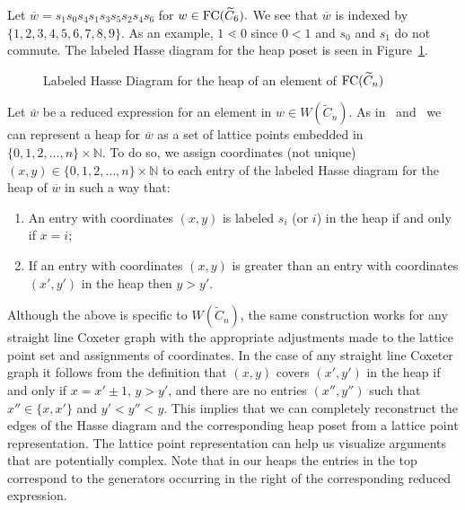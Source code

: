 \begin{example}
Let $\overline{w}=s_1s_0s_4s_1s_3s_5s_2s_4s_6$ for $w \in \mathrm{FC}(\widetilde{C}_6).$ We see that $\overline{w}$ is indexed by $\{1,2,3,4,5,6,7,8,9\}$. As an example, $1 \lessdot 0$ since $0 <1$ and $s_0$ and $s_1$ do not commute. The labeled Hasse diagram for the heap poset is seen in Figure~\ref{fig:Hasse}.
\begin{figure}[h]
\centering
{}
\caption{Labeled Hasse Diagram for the heap of an element of $\mathrm{FC}(\widetilde{C}_n)$}
\label{fig:Hasse}	
\end{figure}
\end{example}

Let $\overline{w}$ be a reduced expression for an element in $w \in W(\widetilde{C}_n)$. As in~\cite{Billey2007} and~\cite{Ernst2010} we can represent a heap for $\overline{w}$ as a set of lattice points embedded in $\{0,1,2,\ldots, n\} \times \mathbb{N}$. To do so, we assign coordinates (not unique) $(x,y) \in \{0,1,2,\ldots, n\} \times \mathbb{N}$ to each entry of the labeled Hasse diagram for the heap of $\overline{w}$ in such a way that:
\begin{enumerate}
\item An entry with coordinates $(x,y)$ is labeled $s_i$ (or $i$) in the heap if and only if $x = i$; 

\item If an entry with coordinates $(x,y)$ is greater than an entry with coordinates $(x',y')$ in the heap then $y > y'$.
\end{enumerate}

Although the above is specific to $W(\widetilde{C}_n)$, the same construction works for any straight line Coxeter graph with the appropriate adjustments made to the lattice point set and assignments of coordinates. In the case of any straight line Coxeter graph it follows from the definition that $(x,y)$ covers $(x',y')$ in the heap if and only if $x = x' \pm 1$, $y > y'$, and there are no entries $(x'', y'')$ such that $x'' \in \{x, x'\}$ and $y'< y'' < y$. This implies that we can completely reconstruct the edges of the Hasse diagram and the corresponding heap poset from a lattice point representation. The lattice point representation can help us visualize arguments that are potentially complex. Note that in our heaps the entries in the top correspond to the generators occurring in the right of the corresponding reduced expression.

